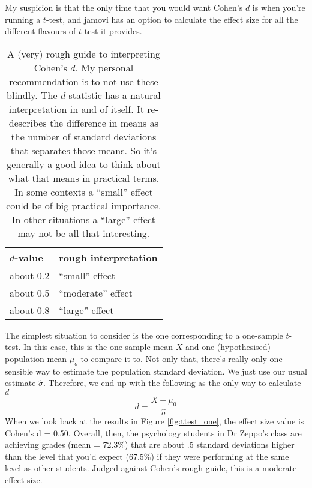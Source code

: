 My suspicion is that the only time that you would want Cohen's $d$ is when you're running a $t$-test, and jamovi has an option to calculate the effect size for all the different flavours of $t$-test it provides. 

\begin{table}[t]
\caption{A (very) rough guide to interpreting Cohen's $d$. My personal recommendation is to not use these blindly. The $d$ statistic has a natural interpretation in and of itself. It re-describes the difference in means as the number of standard deviations that separates those means. So it's generally a good idea to think about what that means in practical terms. In some contexts a ``small'' effect could be of big practical importance. In other situations a ``large'' effect may not be all that interesting.} 
\label{tab:cohensdinterpretation}
\centering
\vspace*{6pt}
\begin{tabular}{l|l}
$d$-value & rough interpretation \\ \hline
about 0.2 & ``small'' effect  \\
about 0.5 & ``moderate'' effect \\
about 0.8 & ``large'' effect 
\end{tabular}
\vspace*{6pt}
\HR
\end{table}


The simplest situation to consider is the one corresponding to a one-sample $t$-test. In this case, this is the one sample mean $\bar{X}$ and one (hypothesised) population mean $\mu_o$ to compare it to. Not only that, there's really only one sensible way to estimate the population standard deviation. We just use our usual estimate $\hat{\sigma}$. Therefore, we end up with the following as the only way to calculate $d$
$$
d = \frac{\bar{X} - \mu_0}{\hat{\sigma}}
$$
When we look back at the results in Figure \ref{fig:ttest_one}, the effect size value is Cohen's d = 0.50. Overall, then, the psychology students in Dr Zeppo's class are achieving grades (mean = 72.3\%) that are about .5 standard deviations higher than the level that you'd expect (67.5\%) if they were performing at the same level as other students. Judged against Cohen's rough guide, this is a moderate effect size.



